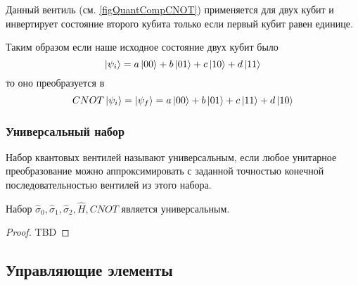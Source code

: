 Данный вентиль (см. \autoref{figQuantCompCNOT}) применяется для двух
кубит и инвертирует состояние 
второго кубита только если первый кубит равен единице.



Таким образом если наше исходное состояние двух кубит было 
\[
\ket{\psi_i} = a \ket{00} + b \ket{01} + c \ket{10} + d \ket{11}
\]
то оно преобразуется в 
\[
CNOT \ket{\psi_i} = \ket{\psi_f} = 
a \ket{00} + b \ket{01} + c \ket{11} + d \ket{10}
\]

\subsubsection{Универсальный набор}

\begin{definition}
Набор квантовых вентилей называют универсальным, если любое унитарное
преобразование можно аппроксимировать с заданной точностью конечной
последовательностью вентилей из этого набора. 
\end{definition}

\begin{theorem}[Китаев]
Набор $\hat{\sigma}_0, \hat{\sigma}_1,
\hat{\sigma}_2, \hat{H}, CNOT$ является универсальным.
\begin{proof}
TBD
\end{proof}
\end{theorem}


\subsection{Управляющие элементы}





 


